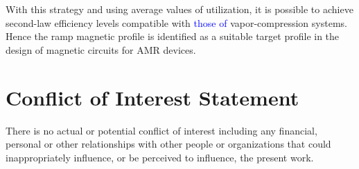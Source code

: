 \documentclass[referee]{svjour3}
\begin{document}
With this strategy and using average values of utilization, it is possible to achieve second-law efficiency levels compatible with \textcolor{blue}{those of} vapor-compression systems. Hence the ramp magnetic profile is identified as a suitable target profile in the design of magnetic circuits for AMR devices.

\section*{Conflict of Interest Statement}

There is no actual or potential conflict of interest including any financial, personal or other relationships with other people or organizations that could inappropriately influence, or be perceived to influence, the present work.






\end{document}
